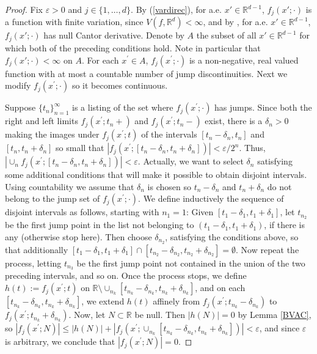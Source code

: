 \documentclass[12pt]{amsart}
\numberwithin{equation}{section}
\theoremstyle{plain}
\theoremstyle{definition}
\theoremstyle{remark}
\begin{document}
\begin{proof} Fix $\varepsilon > 0$ and $j\in \{1,\dots ,d\}$.
By (\ref{vardirec}),
for a.e. $x'\in\mathbb{R}^{d-1}$,
$f_j(x';\cdot)$ is a function with finite variation, since
$V(f, \mathbb{R}^d) < \infty$, and by
\cite[Theorem 3.108]{AFP},
for a.e. $x'\in\mathbb{R}^{d-1}$,
$f_j(x';\cdot)$ has null Cantor derivative.
Denote by  $A$ the subset of all $x'\in\mathbb{R}^{d-1}$ for which
both of the preceding conditions hold.
Note in particular that $f_j(x';\cdot) < \infty$
on $A$. For each  $x^\prime\in A$, $f_j(x^\prime;\cdot)$ is a non-negative,
real valued function with at most a countable number of jump discontinuities. Next we modify $f_j(x^\prime;\cdot)$ so it
becomes continuous.

Suppose $\{t_n\}_{n=1}^\infty$ is a listing of the set where
$f_j(x^\prime;\cdot)$ has jumps. Since both the right and left limits
$f_j(x^\prime; t_n +)$ and $f_j(x^\prime; t_n -)$ exist, there is
a $\delta_n > 0$ making the images under $f_j(x^\prime; t)$ of the intervals
$[t_n - \delta_n, t_n]$ and $[t_n, t_n + \delta_n]$
 so small
 that $|f_j(x^\prime; [t_n - \delta_n, t_n + \delta_n])| < \varepsilon/2^n$. Thus,
$|\cup_n f_j(x^\prime; [t_n - \delta_n, t_n + \delta_n])| < \varepsilon$.
Actually, we want to select
$\delta_{n}$ satisfying some additional conditions that will make it
possible to obtain
 disjoint intervals.
Using countability we assume that $\delta_n$ is chosen so $t_n - \delta_n$ and $t_n + \delta_{n}$ do not
belong to the jump set of  $f_j(x^\prime;\cdot)$.
We define inductively  the sequence of disjoint intervals as
follows, starting with $n_1 = 1$: Given $[t_1 - \delta_1, t_1 + \delta_1]$, let
$t_{n_2}$ be the first jump point in the list not belonging to
$(t_1 - \delta_1, t_1 + \delta_1)$, if there is any (otherwise
stop here). Then choose $ \delta_{n_2}$, satisfying the conditions
above, so that additionally $[t_1 - \delta_1, t_1 + \delta_1]
\cap [t_{n_2} - \delta_{n_2}, t_{n_2} + \delta_{n_2}] = \emptyset$. Now repeat the process, letting $t_{n_3}$ be the first jump point not
contained in the union of the two preceding intervals, and so on. Once the process
stops, we define $h (t) := f_j (x^\prime; t)$ on $\mathbb{R}\setminus
\cup_{n_k} [t_{n_k} - \delta_{n_k}, t_{n_k} + \delta_{n_k}]$, and on each
$[t_{n_k} - \delta_{n_k}, t_{n_k} + \delta_{n_k}]$, we extend $h(t)$  affinely  from $f_j(x^\prime; t_{n_k} - \delta_{n_k})$
to $f_j(x^\prime; t_{n_k} + \delta_{n_k})$. Now, let
$N\subset \mathbb{R}$ be null. Then $|h(N)|= 0$ by Lemma \ref{BVAC},
so $|f_j (x^\prime; N)| \le |h(N)| + | f_j(x^\prime; \cup_{n_k} [t_{n_k} - \delta_{n_k}, t_{n_k} + \delta_{n_k}])| < \varepsilon$, and
since $\varepsilon$ is arbitrary, we conclude that
$|f_j (x^\prime; N)| = 0$.
\end{proof}
\end{document}
